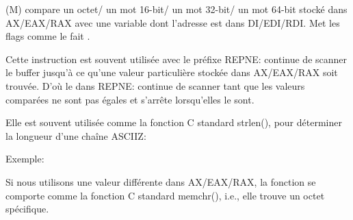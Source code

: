 \item[SCASB/SCASW/SCASD/SCASQ] (M) compare un octet/
un mot 16-bit/
un mot 32-bit/
un mot 64-bit stocké dans AX/EAX/RAX
avec une variable dont l'adresse est dans DI/EDI/RDI.
Met les flags comme le fait \CMP.

\label{REPNE_SCASx}
Cette instruction est souvent utilisée avec le préfixe REPNE: continue de scanner
le buffer jusqu'à ce qu'une valeur particulière stockée dans AX/EAX/RAX soit trouvée.
D'où le  dans REPNE: continue de scanner tant que les valeurs comparées ne
sont pas égales et s'arrête lorsqu'elles le sont.

Elle est souvent utilisée comme la fonction C standard strlen(), pour déterminer
la longueur d'une chaîne \ac{ASCIIZ}:

Exemple:



Si nous utilisons une valeur différente dans AX/EAX/RAX, la fonction se comporte
comme la fonction C standard memchr(), i.e., elle trouve un octet spécifique.

